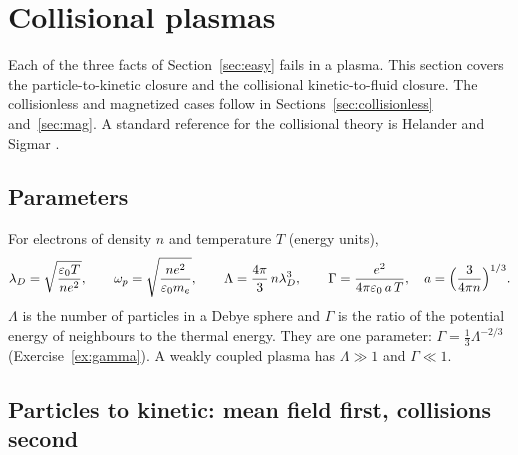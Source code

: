 \section{Collisional plasmas}
\label{sec:plasma}

Each of the three facts of Section~\ref{sec:easy} fails in a plasma. This
section covers the particle-to-kinetic closure and the collisional
kinetic-to-fluid closure. The collisionless and magnetized cases follow in
Sections~\ref{sec:collisionless} and~\ref{sec:mag}. A standard reference
for the collisional theory is Helander and Sigmar \cite{HelanderSigmar02}.

\subsection{Parameters}

For electrons of density $n$ and temperature $T$ (energy units),
\[
  \lambda_D=\sqrt{\frac{\varepsilon_0T}{ne^2}},\qquad
  \omega_p=\sqrt{\frac{ne^2}{\varepsilon_0m_e}},\qquad
  \Lambda=\frac{4\pi}{3}\,n\lambda_D^3,\qquad
  \Gamma=\frac{e^2}{4\pi\varepsilon_0\,a\,T},\quad
  a=\Bigl(\frac{3}{4\pi n}\Bigr)^{1/3}.
\]
$\Lambda$ is the number of particles in a Debye sphere and $\Gamma$ is the
ratio of the potential energy of neighbours to the thermal energy. They are
one parameter: $\Gamma=\tfrac13\Lambda^{-2/3}$
(Exercise~\ref{ex:gamma}). A weakly coupled plasma has $\Lambda\gg1$ and
$\Gamma\ll1$.

\subsection{Particles to kinetic: mean field first, collisions second}

